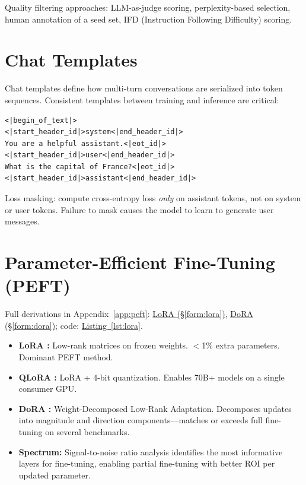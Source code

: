 Quality filtering approaches: LLM-as-judge scoring, perplexity-based selection, human annotation of a seed set, IFD (Instruction Following Difficulty) scoring.

\section{Chat Templates}

Chat templates define how multi-turn conversations are serialized into token sequences. Consistent templates between training and inference are critical:

\begin{lstlisting}[style=pythonstyle, caption={Example chat template (Llama 3 format)}]
<|begin_of_text|>
<|start_header_id|>system<|end_header_id|>
You are a helpful assistant.<|eot_id|>
<|start_header_id|>user<|end_header_id|>
What is the capital of France?<|eot_id|>
<|start_header_id|>assistant<|end_header_id|>
\end{lstlisting}

Loss masking: compute cross-entropy loss \emph{only} on assistant tokens, not on system or user tokens. Failure to mask causes the model to learn to generate user messages.

\section{Parameter-Efficient Fine-Tuning (PEFT)}

Full derivations in Appendix~\ref{app:peft}: \hyperref[form:lora]{LoRA (\S\ref*{form:lora})}, \hyperref[form:dora]{DoRA (\S\ref*{form:dora})}; code: \hyperref[lst:lora]{Listing~\ref*{lst:lora}}.

\begin{itemize}
  \item \textbf{LoRA \parencite{hu2022lora}:} Low-rank matrices on frozen weights. $<$1\% extra parameters. Dominant PEFT method.
  \item \textbf{QLoRA \parencite{dettmers2023qlora}:} LoRA + 4-bit quantization. Enables 70B+ models on a single consumer GPU.
  \item \textbf{DoRA \parencite{liu2024dora}:} Weight-Decomposed Low-Rank Adaptation. Decomposes updates into magnitude and direction components---matches or exceeds full fine-tuning on several benchmarks.
  \item \textbf{Spectrum:} Signal-to-noise ratio analysis identifies the most informative layers for fine-tuning, enabling partial fine-tuning with better ROI per updated parameter.
\end{itemize}
